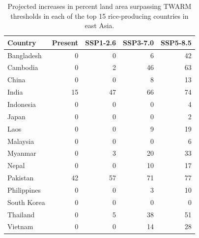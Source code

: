 \documentclass[
  letterpaper,
  DIV=11,
  numbers=noendperiod]{scrartcl}
\begin{document}
\begin{longtable}[]{@{}lrrrr@{}}

\caption{\label{tbl-country-summaries-table2}Projected increases in
percent land area surpassing TWARM thresholds in each of the top 15
rice-producing countries in east Asia.}

\tabularnewline

\toprule\noalign{}
Country & Present & SSP1-2.6 & SSP3-7.0 & SSP5-8.5 \\
\midrule\noalign{}
\endhead
\bottomrule\noalign{}
\endlastfoot
Bangladesh & 0 & 0 & 6 & 42 \\
Cambodia & 0 & 2 & 46 & 63 \\
China & 0 & 0 & 8 & 13 \\
India & 15 & 47 & 66 & 74 \\
Indonesia & 0 & 0 & 0 & 4 \\
Japan & 0 & 0 & 0 & 2 \\
Laos & 0 & 0 & 9 & 19 \\
Malaysia & 0 & 0 & 0 & 6 \\
Myanmar & 0 & 3 & 20 & 33 \\
Nepal & 0 & 0 & 10 & 17 \\
Pakistan & 42 & 57 & 71 & 77 \\
Philippines & 0 & 0 & 3 & 10 \\
South Korea & 0 & 0 & 0 & 0 \\
Thailand & 0 & 5 & 38 & 51 \\
Vietnam & 0 & 0 & 14 & 28 \\

\end{longtable}

\newpage{}
\end{document}
